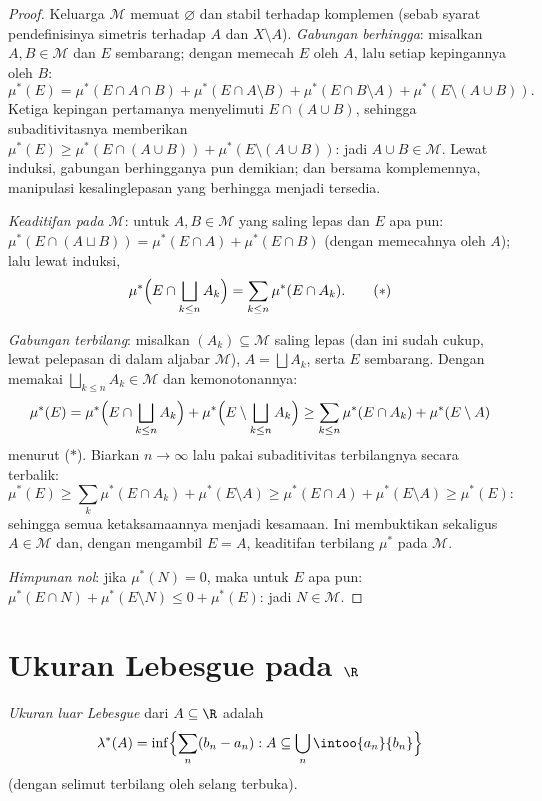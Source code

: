 \begin{proof}
Keluarga $\mathcal M$ memuat $\varnothing$ dan stabil terhadap
komplemen (sebab syarat pendefinisinya simetris terhadap $A$ dan
$X\setminus A$). \emph{Gabungan berhingga}: misalkan $A, B \in \mathcal
M$ dan $E$ sembarang; dengan memecah $E$ oleh $A$, lalu setiap kepingannya oleh
$B$:
\[
\mu^*(E) = \mu^*(E\cap A\cap B) + \mu^*(E\cap A\setminus B) +
\mu^*(E\cap B\setminus A) + \mu^*(E\setminus(A\cup B)).
\]
Ketiga kepingan pertamanya menyelimuti $E \cap (A \cup B)$, sehingga
subaditivitasnya memberikan $\mu^*(E) \geq \mu^*(E\cap(A\cup B)) +
\mu^*(E\setminus(A\cup B))$: jadi $A \cup B \in \mathcal M$. Lewat
induksi, gabungan berhingganya pun demikian; dan bersama komplemennya, manipulasi
kesalinglepasan yang berhingga menjadi tersedia.

\emph{Keaditifan pada $\mathcal M$}: untuk $A, B \in
\mathcal M$ yang saling lepas dan $E$ apa pun: $\mu^*(E\cap(A\sqcup B)) = \mu^*(E\cap
A) + \mu^*(E \cap B)$ (dengan memecahnya oleh $A$); lalu lewat induksi,
\[
\mu^*\Bigl(E \cap \bigsqcup_{k\leq n}A_k\Bigr)
= \sum_{k\leq n}\mu^*(E\cap A_k).
\tag{$*$}
\]

\emph{Gabungan terbilang}: misalkan $(A_k) \subseteq \mathcal M$
saling lepas (dan ini sudah cukup, lewat pelepasan di dalam aljabar
$\mathcal M$), $A = \bigsqcup A_k$, serta $E$ sembarang. Dengan memakai
$\bigsqcup_{k\leq n}A_k \in \mathcal M$ dan kemonotonannya:
\[
\mu^*(E) = \mu^*\Bigl(E\cap\bigsqcup_{k\leq n}A_k\Bigr) +
\mu^*\Bigl(E\setminus\bigsqcup_{k\leq n}A_k\Bigr)
\geq \sum_{k \leq n}\mu^*(E\cap A_k) + \mu^*(E\setminus A)
\]
menurut ($*$). Biarkan $n \to \infty$ lalu pakai subaditivitas terbilangnya
secara terbalik:
\[
\mu^*(E) \geq \sum_{k}\mu^*(E\cap A_k) + \mu^*(E\setminus A)
\geq \mu^*(E \cap A) + \mu^*(E\setminus A) \geq \mu^*(E):
\]
sehingga semua ketaksamaannya menjadi kesamaan. Ini membuktikan sekaligus $A \in
\mathcal M$ dan, dengan mengambil $E = A$, keaditifan terbilang
$\mu^*$ pada $\mathcal M$.

\emph{Himpunan nol}: jika $\mu^*(N) = 0$, maka untuk $E$ apa pun:
$\mu^*(E \cap N) + \mu^*(E\setminus N) \leq 0 + \mu^*(E)$:
jadi $N \in \mathcal M$.
\end{proof}

\section{Ukuran Lebesgue pada \texorpdfstring{$\R$}{R}}

\begin{definition}\label{def:b3:measure:lebesgueouter}
\emph{Ukuran luar Lebesgue} dari $A
\subseteq \R$ adalah
\[
\lambda^*(A) = \inf\Bigl\{\sum_{n} (b_n - a_n) :
A \subseteq \bigcup_n \intoo{a_n}{b_n}\Bigr\}
\]
(dengan selimut terbilang oleh selang terbuka).
\end{definition}

